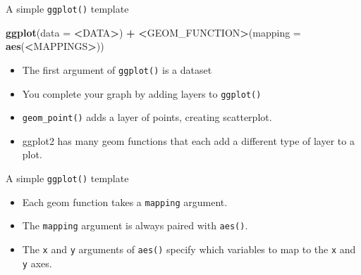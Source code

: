 \documentclass[ignorenonframetext,]{beamer}
\newenvironment{Shaded}{\begin{snugshade}}{\end{snugshade}}
\newcommand{\DataTypeTok}[1]{\textcolor[rgb]{0.13,0.29,0.53}{#1}}
\newcommand{\ErrorTok}[1]{\textcolor[rgb]{0.64,0.00,0.00}{\textbf{#1}}}
\newcommand{\KeywordTok}[1]{\textcolor[rgb]{0.13,0.29,0.53}{\textbf{#1}}}
\newcommand{\NormalTok}[1]{#1}
\newcommand{\OperatorTok}[1]{\textcolor[rgb]{0.81,0.36,0.00}{\textbf{#1}}}
\newcommand{\StringTok}[1]{\textcolor[rgb]{0.31,0.60,0.02}{#1}}
\begin{document}
\begin{frame}[fragile]{A simple \texttt{ggplot()} template}
\protect\hypertarget{a-simple-ggplot-template}{}

\begin{Shaded}
\begin{Highlighting}[]
\KeywordTok{ggplot}\NormalTok{(}\DataTypeTok{data =} \OperatorTok{<}\NormalTok{DATA}\OperatorTok{>}\NormalTok{) }\OperatorTok{+}\StringTok{ }
\StringTok{  }\ErrorTok{<}\NormalTok{GEOM_FUNCTION}\OperatorTok{>}\NormalTok{(}\DataTypeTok{mapping =} \KeywordTok{aes}\NormalTok{(}\OperatorTok{<}\NormalTok{MAPPINGS}\OperatorTok{>}\NormalTok{))}
\end{Highlighting}
\end{Shaded}

\begin{itemize}
\item
  The first argument of \texttt{ggplot()} is a dataset
\item
  You complete your graph by adding layers to \texttt{ggplot()}
\item
  \texttt{geom\_point()} adds a layer of points, creating scatterplot.
\item
  ggplot2 has many geom functions that each add a different type of
  layer to a plot.
\end{itemize}

\end{frame}

\begin{frame}[fragile]{A simple \texttt{ggplot()} template}
\protect\hypertarget{a-simple-ggplot-template-1}{}

\begin{itemize}
\item
  Each geom function takes a \texttt{mapping} argument.
\item
  The \texttt{mapping} argument is always paired with \texttt{aes()}.
\item
  The \texttt{x} and \texttt{y} arguments of \texttt{aes()} specify
  which variables to map to the \texttt{x} and \texttt{y} axes.
\end{itemize}

\end{frame}
\end{document}
